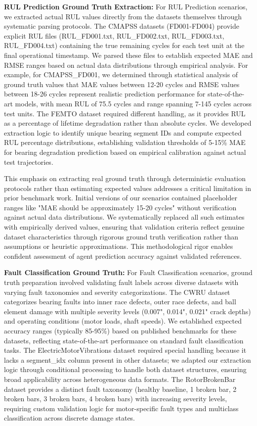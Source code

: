 \documentclass[sigconf]{acmart}
\begin{document}
\textbf{RUL Prediction Ground Truth Extraction:} For RUL Prediction scenarios, we extracted actual RUL values directly from the datasets themselves through systematic parsing protocols. The CMAPSS datasets (FD001-FD004) provide explicit RUL files (RUL\_FD001.txt, RUL\_FD002.txt, RUL\_FD003.txt, RUL\_FD004.txt) containing the true remaining cycles for each test unit at the final operational timestamp. We parsed these files to establish expected MAE and RMSE ranges based on actual data distributions through empirical analysis. For example, for CMAPSS\_FD001, we determined through statistical analysis of ground truth values that MAE values between 12-20 cycles and RMSE values between 18-26 cycles represent realistic prediction performance for state-of-the-art models, with mean RUL of 75.5 cycles and range spanning 7-145 cycles across test units. The FEMTO dataset required different handling, as it provides RUL as a percentage of lifetime degradation rather than absolute cycles. We developed extraction logic to identify unique bearing segment IDs and compute expected RUL percentage distributions, establishing validation thresholds of 5-15\% MAE for bearing degradation prediction based on empirical calibration against actual test trajectories.

This emphasis on extracting real ground truth through deterministic evaluation protocols rather than estimating expected values addresses a critical limitation in prior benchmark work. Initial versions of our scenarios contained placeholder ranges like "MAE should be approximately 15-20 cycles" without verification against actual data distributions. We systematically replaced all such estimates with empirically derived values, ensuring that validation criteria reflect genuine dataset characteristics through rigorous ground truth verification rather than assumptions or heuristic approximations. This methodological rigor enables confident assessment of agent prediction accuracy against validated references.

\textbf{Fault Classification Ground Truth:} For Fault Classification scenarios, ground truth preparation involved validating fault labels across diverse datasets with varying fault taxonomies and severity categorizations. The CWRU dataset categorizes bearing faults into inner race defects, outer race defects, and ball element damage with multiple severity levels (0.007", 0.014", 0.021" crack depths) and operating conditions (motor loads, shaft speeds). We established expected accuracy ranges (typically 85-95\%) based on published benchmarks for these datasets, reflecting state-of-the-art performance on standard fault classification tasks. The ElectricMotorVibrations dataset required special handling because it lacks a segment\_idx column present in other datasets; we adapted our extraction logic through conditional processing to handle both dataset structures, ensuring broad applicability across heterogeneous data formats. The RotorBrokenBar dataset provides a distinct fault taxonomy (healthy baseline, 1 broken bar, 2 broken bars, 3 broken bars, 4 broken bars) with increasing severity levels, requiring custom validation logic for motor-specific fault types and multiclass classification across discrete damage states.
\end{document}
